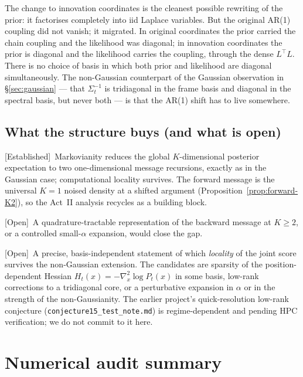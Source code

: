 \documentclass[11pt]{article}
\theoremstyle{definition}
\newcommand{\Sig}{\Sigma}
\newcommand{\Established}{\textcolor{black!50!green}{\textsf{[Established]}}}
\newcommand{\OpenTag}{\textcolor{black!60!red}{\textsf{[Open]}}}
\begin{document}
\begin{intuition}
The change to innovation coordinates is the cleanest possible
rewriting of the prior: it factorises completely into iid Laplace
variables. But the original AR(1) coupling did not vanish; it migrated.
In original coordinates the prior carried the chain coupling and the
likelihood was diagonal; in innovation coordinates the prior is
diagonal and the likelihood carries the coupling, through the dense
\(L^\top L\). There is no choice of basis in which both prior and
likelihood are diagonal simultaneously. The non-Gaussian counterpart
of the Gaussian observation in \S\ref{sec:gaussian} --- that
\(\Sig_t^{-1}\) is tridiagonal in the frame basis and diagonal in the
spectral basis, but never both --- is that the AR(1) shift has to live
somewhere.
\end{intuition}

\subsection{What the structure buys (and what is open)}

\Established\ Markovianity reduces the global \(K\)-dimensional
posterior expectation to two one-dimensional message recursions,
exactly as in the Gaussian case; computational locality survives.
The forward message is the universal \(K = 1\) noised density at a
shifted argument (Proposition~\ref{prop:forward-K2}), so the Act~II
analysis recycles as a building block.

\OpenTag\ A quadrature-tractable representation of the backward
message at \(K \geq 2\), or a controlled small-\(\alpha\) expansion,
would close the gap.

\OpenTag\ A precise, basis-independent statement of which
\emph{locality} of the joint score survives the non-Gaussian
extension. The candidates are sparsity of the position-dependent
Hessian \(H_t(x) = -\nabla_x^2 \log P_t(x)\) in some basis, low-rank
corrections to a tridiagonal core, or a perturbative expansion in
\(\alpha\) or in the strength of the non-Gaussianity. The earlier
project's quick-resolution low-rank conjecture
(\texttt{conjecture15\_test\_note.md}) is regime-dependent and pending
HPC verification; we do not commit to it here.

\section{Numerical audit summary}\label{sec:audit}
\end{document}
